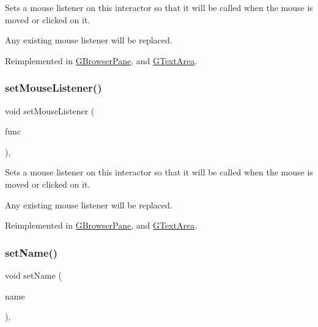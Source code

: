 Sets a mouse listener on this interactor so that it will be called when the mouse is moved or clicked on it. 

Any existing mouse listener will be replaced. 

Reimplemented in \mbox{\hyperlink{classsgl_1_1GBrowserPane_a2c6a3746da7ffa3819294896d4423059}{G\+Browser\+Pane}}, and \mbox{\hyperlink{classsgl_1_1GTextArea_a2c6a3746da7ffa3819294896d4423059}{G\+Text\+Area}}.

\mbox{\label{classsgl_1_1GInteractor_aea7f647ea62d59f71b5fad6aa65eeaf9}} 
\subsubsection{\texorpdfstring{set\+Mouse\+Listener()}{setMouseListener()}\hspace{0.1cm}{\footnotesize\ttfamily [2/2]}}
{\footnotesize\ttfamily void set\+Mouse\+Listener (\begin{DoxyParamCaption}\item[{\mbox{\hyperlink{namespacesgl_a54427ce97bb1c2804e4fe2b0a62e8b17}{G\+Event\+Listener\+Void}}}]{func }\end{DoxyParamCaption})\hspace{0.3cm}{\ttfamily [virtual]}, {\ttfamily [inherited]}}



Sets a mouse listener on this interactor so that it will be called when the mouse is moved or clicked on it. 

Any existing mouse listener will be replaced. 

Reimplemented in \mbox{\hyperlink{classsgl_1_1GBrowserPane_a3ed42c5f929cba378927916dd73e6576}{G\+Browser\+Pane}}, and \mbox{\hyperlink{classsgl_1_1GTextArea_a3ed42c5f929cba378927916dd73e6576}{G\+Text\+Area}}.

\mbox{\label{classsgl_1_1GInteractor_a9d3a2685df23b5e7cbf59c19c4a1f9b5}} 
\subsubsection{\texorpdfstring{set\+Name()}{setName()}}
{\footnotesize\ttfamily void set\+Name (\begin{DoxyParamCaption}\item[{const std\+::string \&}]{name }\end{DoxyParamCaption})\hspace{0.3cm}{\ttfamily [virtual]}, {\ttfamily [inherited]}}



